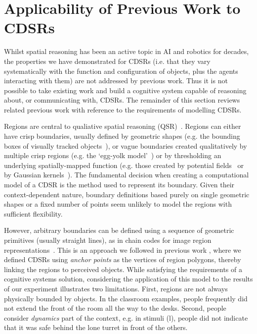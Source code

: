 \documentclass[11pt,letterpaper]{article}
\begin{document}
\section{Applicability of Previous Work to CDSRs}

Whilst spatial reasoning has been an active topic in AI and robotics for decades, the properties we have demonstrated for CDSRs (i.e. that they vary systematically with the function and configuration of objects, plus the agents interacting with them) are not addressed by previous work.  Thus it is not possible to take existing work and build a cognitive system capable of reasoning about, or communicating with, CDSRs.  The remainder of this section reviews related previous work with reference to the requirements of modelling CDSRs.
 
Regions are central to qualiative spatial reasoning (QSR)~\cite{Cohn:2001}. Regions can either have crisp boundaries, usually defined by geometric shapes (e.g. the bounding boxes of visually tracked objects~\cite{SridharCohn:10}), or vague boundaries created qualitatively by multiple crisp regions (e.g. the `egg-yolk model'~\cite{Cohn96b}) or by thresholding an underlying spatially-mapped function (e.g. those created by potential fields~\cite{brenneretal07ijcai,kelleher/costello:09} or by Gaussian kernels~\cite{burbridge-dearden12}). The fundamental decision when creating a computational model of a CDSR is the method used to represent its boundary. Given their context-dependent nature, boundary definitions based purely on single geometric shapes or a fixed number of points seem unlikely to model the regions with sufficient flexibility.

However, arbitrary boundaries can be defined using a sequence of geometric primitives (usually straight lines), as in chain codes for image region representations~\cite{Freeman:1961}. This is an approach we followed in previous work \cite{Hawes:2012}, where we defined CDSRs using \textit{anchor points} \cite{DBLP:journals/jetai/KlenkFTK11} as the vertices of region polygons, thereby linking the regions to perceived objects.  While satisfying the requirements of a cognitive systems solution, considering the application of this model to the  results of our experiment illustrates two limitations.  First, regions are not always physically bounded by objects.  In the classroom examples, people frequently did not extend the front of the room all the way to the desks.  Second, people consider \emph{dynamics} part of the context, e.g. in stimuli (l), people did not indicate that it was safe behind the lone turret in front of the others.
\end{document}
